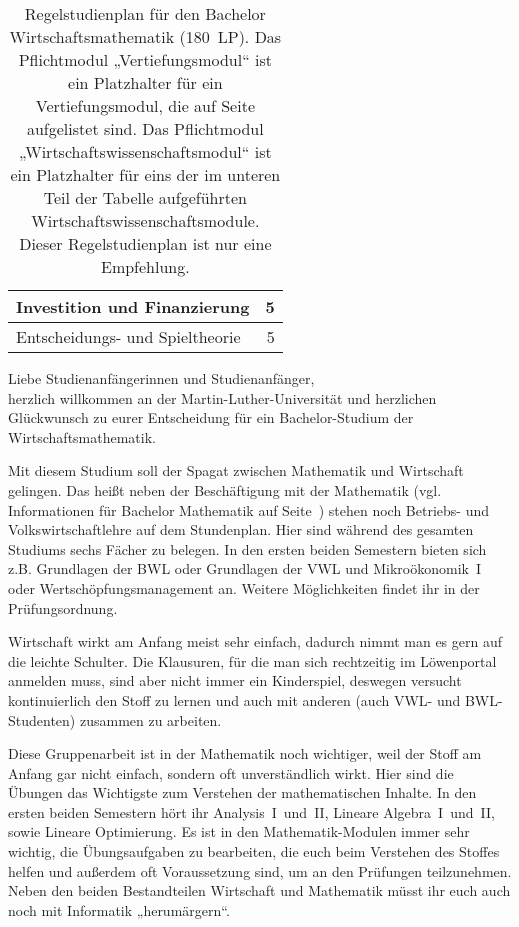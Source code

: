 \begin{table}[tbp]
\begin{small}
\begin{tabularx}{\textwidth}{|X||c|c|c|c|c|c||r|}
        \multicolumn{7}{|X||}{Investition und Finanzierung}&5\\\hline
        \multicolumn{7}{|X||}{Entscheidungs- und Spieltheorie}&5\\\hline
    \end{tabularx}
    \end{small}
    \caption{\label{plan-wima}Regelstudienplan für den Bachelor Wirtschaftsmathematik (180~LP). Das Pflichtmodul „Vertiefungsmodul“ ist ein Platzhalter für ein Vertiefungsmodul, die auf Seite \pageref{studiengang_mathematik} aufgelistet sind. Das Pflichtmodul „Wirtschaftswissenschaftsmodul“ ist ein Platzhalter für eins der im unteren Teil der Tabelle aufgeführten Wirtschaftswissenschaftsmodule. Dieser Regelstudienplan ist nur eine Empfehlung.}
\end{table}

Liebe Studienanfängerinnen und Studienanfänger,\\
herzlich willkommen an der Martin-Luther-Universität und herzlichen Glückwunsch zu eurer Entscheidung für ein Bachelor-Studium der Wirtschaftsmathematik.

Mit diesem Studium soll der Spagat zwischen Mathematik und Wirtschaft gelingen.
Das heißt neben der Beschäftigung mit der Mathematik (vgl. Informationen für Bachelor Mathematik auf Seite~\pageref{studiengang_mathematik}) stehen noch Betriebs- und Volkswirtschaftlehre auf dem Stundenplan.
Hier sind während des gesamten Studiums sechs Fächer zu belegen.
In den ersten beiden Semestern bieten sich z.B. Grundlagen der BWL oder Grundlagen der VWL und Mikroökonomik~I oder Wertschöpfungsmanagement an.
Weitere Möglichkeiten findet ihr in der Prüfungsordnung.

Wirtschaft wirkt am Anfang meist sehr einfach, dadurch nimmt man es gern auf die leichte Schulter.
Die Klausuren, für die man sich rechtzeitig im Löwenportal anmelden muss, sind aber nicht immer ein Kinderspiel, deswegen versucht kontinuierlich den Stoff zu lernen und auch mit anderen (auch VWL- und BWL-Studenten) zusammen zu arbeiten.

Diese Gruppenarbeit ist in der Mathematik noch wichtiger, weil der Stoff am Anfang gar nicht einfach, sondern oft unverständlich wirkt.
Hier sind die Übungen das Wichtigste zum Verstehen der mathematischen Inhalte.
In den ersten beiden Semestern hört ihr Analysis~I~und~II, Lineare Algebra~I~und~II, sowie Lineare Optimierung.
Es ist in den Mathematik-Modulen immer sehr wichtig, die Übungsaufgaben zu bearbeiten, die euch beim Verstehen des Stoffes helfen und außerdem oft Voraussetzung sind, um an den Prüfungen teilzunehmen.
Neben den beiden Bestandteilen Wirtschaft und Mathematik müsst ihr euch auch noch mit Informatik „herumärgern“.

